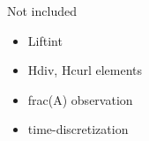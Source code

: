 
Not included 
\begin{itemize}
\item Liftint  
\item Hdiv, Hcurl elements 
\item frac(A) observation 
\item time-discretization 
\end{itemize}
